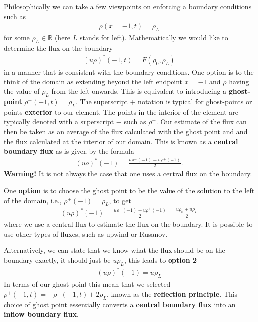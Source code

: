 \documentclass{report}
\numberwithin{equation}{section}
\begin{document}
Philosophically we can take a few viewpoints on enforcing a boundary conditions such as
\begin{align}
\rho(x=-1, t) = \rho_L
\end{align}
for some $\rho_L \in \mathbb{R}$ (here $L$ stands for left). Mathematically we would like to determine the flux on the boundary
\begin{align}
    (u\rho)^*(-1,t) = F( \rho_0, \rho_L)
\end{align}
in a manner that is consistent with the boundary conditions. One option is to the think of the domain as extending beyond the left endpoint $x  = -1$ and $\rho$ having the value of $\rho_L$ from the left onwards. This is equivalent to introducing a \textbf{ghost-point} $\rho^+(-1,t) = \rho_L$. The superscript $+$ notation is typical for ghost-points or points \textbf{exterior} to our element. The points in the interior of the element are typically denoted with a superscript $-$ such as $\rho^-$. Our estimate of the flux can then be taken as an average of the flux calculated with the ghost point and and the flux calculated at the interior of our domain. This is known as a \textbf{central boundary flux} as is given by the formula
\begin{align}
(u\rho)^*(-1) = \frac{u\rho^-(-1) + u\rho^+(-1)}{2}.
\end{align}
\textbf{Warning!} It is not always the case that one uses a central flux on the boundary.

One \textbf{option} is to choose the ghost point to be the value of the solution to the left of the domain, i.e., $\rho^+(-1) = \rho_L$, to get
\begin{align}
(u\rho)^*(-1) = \frac{u\rho^-(-1) + u\rho^+(-1)}{2} = \frac{u \rho_0 + u \rho_L}{2}
\end{align}
where we use a central flux to estimate the flux on the boundary. It is possible to use other types of fluxes, such as upwind or Rusanov. 

Alternatively, we can state that we know what the flux should be on the boundary exactly, it should just be $u \rho_L$, this leads to \textbf{option 2} 
\begin{align}
(u\rho)^*(-1) = u \rho_L
\end{align}
In terms of our ghost point this mean that we selected $\rho^+(-1,t) = - \rho^-(-1,t) + 2 \rho_L$, known as the \textbf{reflection principle}. This choice of ghost point essentially converts a \textbf{central boundary flux} into an \textbf{inflow boundary flux}.
\end{document}
